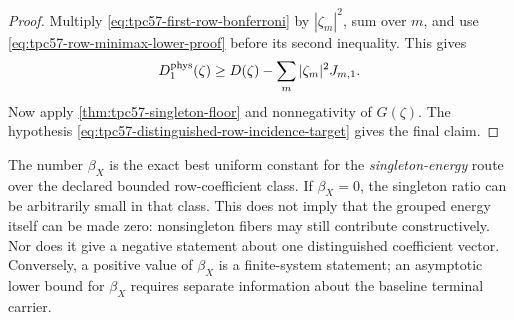 \begin{proof}
Multiply \eqref{eq:tpc57-first-row-bonferroni} by
\(|\zeta_m|^2\), sum over \(m\), and use
\eqref{eq:tpc57-row-minimax-lower-proof} before its second inequality.
This gives
\[
 D_1^{\rm phys}(\zeta)
 \ge D(\zeta)-\sum_m|\zeta_m|^2J_{m,1}.
\]
Now apply \cref{thm:tpc57-singleton-floor} and nonnegativity of
\(G(\zeta)\).  The hypothesis
\eqref{eq:tpc57-distinguished-row-incidence-target} gives the final
claim.
\end{proof}

\begin{remark}
\label{rem:tpc57-row-minimax-scope}
The number \(\beta_X\) is the exact best uniform constant for the
\emph{singleton-energy} route over the declared bounded row-coefficient
class.  If \(\beta_X=0\), the singleton ratio can be arbitrarily small in
that class.  This does not imply that the grouped energy itself can be made
zero: nonsingleton fibers may still contribute constructively.  Nor does it
give a negative statement about one distinguished coefficient vector.
Conversely, a positive value of \(\beta_X\) is a finite-system statement;
an asymptotic lower bound for \(\beta_X\) requires separate information
about the baseline terminal carrier.
\end{remark}
